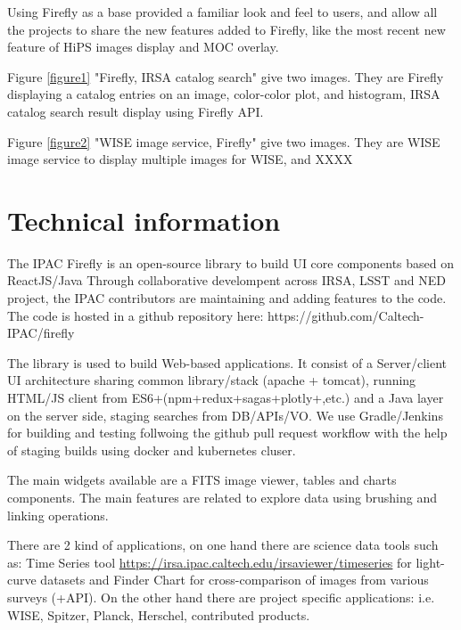 \documentclass[11pt,twoside]{article}
\begin{document}
Using Firefly as a base provided a familiar look and feel to users, and allow all the projects to share the new features added to Firefly, like the most recent new feature of HiPS images display and MOC overlay.

Figure \ref{figure1} "Firefly, IRSA catalog search" give two images. They are Firefly displaying a catalog entries on an image, color-color plot, and histogram,
IRSA catalog search result display using Firefly API.

Figure \ref{figure2} "WISE image service, Firefly" give two images. They are WISE image service to display multiple images for WISE, and XXXX


\smallskip
\smallskip

\section{Technical information}

The IPAC Firefly is an open-source library to build UI core components based on ReactJS/Java Through collaborative develompent across IRSA, LSST and NED project, the IPAC contributors are maintaining and adding features to the code.
The code is hosted in a github repository here: https://github.com/Caltech-IPAC/firefly

The library is used to build Web-based applications. It consist of a Server/client UI architecture sharing common library/stack (apache + tomcat), running HTML/JS client from ES6+(npm+redux+sagas+plotly+,etc.) and a Java layer on the server side, staging searches from DB/APIs/VO. We use Gradle/Jenkins for building and testing follwoing the github pull request workflow with the help of staging builds using docker and kubernetes cluser.

The main widgets available are a FITS image viewer, tables and charts components. The main features are related to explore data using brushing and linking operations.

There are 2 kind of applications, on one hand there are science data tools such as:
Time Series tool {\url{https://irsa.ipac.caltech.edu/irsaviewer/timeseries}} for light-curve datasets and Finder Chart for cross-comparison of images from various surveys (+API).
On the other hand there are project specific applications: i.e. WISE, Spitzer, Planck, Herschel, contributed products.
\end{document}
